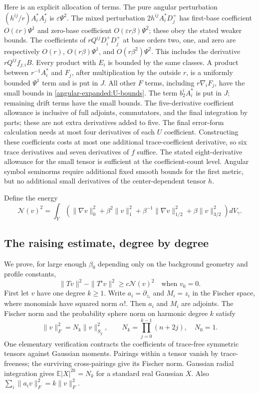 \documentclass[11pt]{article}
\theoremstyle{definition}
\theoremstyle{remark}
\numberwithin{equation}{section}
\begin{document}
Here is an explicit allocation of terms.  The pure angular perturbation
$(h^{ij}/r)A_i^*A_j^*$ is $\varepsilon\Psi^2$.  The mixed perturbation
$2h^{ij}A_i^*D_j^+$ has first-base coefficient
$O(\varepsilon r)\Psi^1$ and zero-base coefficient
$O(\varepsilon r\beta)\Psi^2$; these obey the stated weaker bounds.
The coefficients of $rQ^{ij}D_i^+D_j^+$ at base orders two, one, and zero
are respectively $O(r)$, $O(r\beta)\Psi^1$, and
$O(r\beta^2)\Psi^2$.  This includes the derivative $rQ^{ij}f_{j;i}B$.
Every product with $E_i$ is bounded by the same classes.  A product
between $r^{-1}A_i^*$ and $F_j$, after multiplication by the outside $r$,
is a uniformly bounded $\Psi^1$ term and is put in $J$.
All other $F$ terms, including $r\nabla_iF_j$, have the small bounds in
\eqref{angular-expanded:U-bounds}.  The term $b_2^iA_i^*$ is put in $J$; remaining
drift terms have the small bounds. The five-derivative coefficient
allowance is inclusive of full adjoints, commutators, and the final
integration by parts; these are not extra derivatives added to five.
The final error-form calculation needs at most four derivatives of each
$U$ coefficient. Constructing these coefficients costs at most one
additional trace-coefficient derivative, so six trace derivatives and
seven derivatives of $f$ suffice. The stated eight-derivative allowance
for the small tensor is sufficient
at the coefficient-count level.  Angular symbol seminorms require additional
fixed smooth bounds for the first metric, but no additional small derivatives
of the center-dependent tensor $h$.

Define the energy
\begin{equation}\label{angular-expanded:N-definition}
 \mathcal N(v)^2=\int_Y\left(
 \|\nabla v\|_0^2+\beta^2\|v\|_1^2+
 \beta^{-1}\|\nabla v\|_{1/2}^2+\beta\|v\|_{3/2}^2
 \right)dV_\gamma.
\end{equation}

\subsection{The raising estimate, degree by degree}
\label{angular-expanded:raising}

We prove, for large enough $\beta_0$ depending only on the background
geometry and profile constants,
\begin{equation}\label{angular-expanded:raising-estimate}
 \|Tv\|^2-\|T^\flat v\|^2\geq c\mathcal N(v)^2
 \quad\text{when }v_0=0.
\end{equation}
First let $v$ have one degree $k\geq1$.  Write $a_i=\partial_{z_i}$ and
$M_i=z_i$ in the Fischer space, where monomials have squared norm
$\alpha!$.  Then $a_i$ and $M_i$ are adjoints.  The Fischer norm and the
probability sphere norm on harmonic degree $k$ satisfy
\[
 \|v\|_F^2=N_k\|v\|_{S_y}^2,
 \qquad N_k=\prod_{j=0}^{k-1}(n+2j),\quad N_0=1.
\]
One elementary verification contracts the coefficients of trace-free
symmetric tensors against Gaussian moments.  Pairings within a tensor
vanish by trace-freeness; the surviving cross-pairings give its Fischer
norm.  Gaussian radial integration gives
$\mathbb E|X|^{2k}=N_k$ for a standard real Gaussian $X$.
Also $\sum_i\|a_iv\|_F^2=k\|v\|_F^2$.
\end{document}
